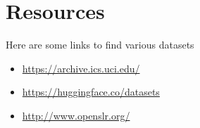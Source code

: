 \section{Resources}
Here are some links to find various datasets
\begin{itemize}
  \item \href{https://archive.ics.uci.edu/}{https://archive.ics.uci.edu/}
  \item \href{https://huggingface.co/datasets}{https://huggingface.co/datasets}
  \item \href{http://www.openslr.org/}{http://www.openslr.org/}
\end{itemize}